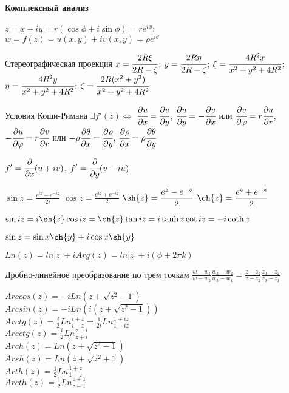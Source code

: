 \begin{center}
	\textbf{Комплексный анализ}
\end{center}
\vspace{1ex}

$\displaystyle z = x + iy = r(\cos{\phi} + i\sin{\phi}) = re^{i\phi}$;
$\displaystyle w = f(z) = u(x, y) + iv(x, y) = \rho e^{i\theta}$

\noindent
Стереографическая проекция
$\displaystyle x = \cfrac{2R\xi}{2R-\zeta}$;
$\displaystyle y = \cfrac{2R\eta}{2R-\zeta}$;
$\displaystyle \xi = \cfrac{4R^2x}{x^2+y^2+4R^2}$;
$\displaystyle \eta = \cfrac{4R^2y}{x^2+y^2+4R^2}$;
$\displaystyle \zeta = \cfrac{2R(x^2+y^2)}{x^2+y^2+4R^2}$

\noindent
Условия Коши-Римана $\displaystyle \exists f'(z) \Leftrightarrow$
$\displaystyle \cfrac{\partial u}{\partial x} = \cfrac{\partial v}{\partial y}$,
$\displaystyle \cfrac{\partial u}{\partial y} = -\cfrac{\partial v}{\partial x}$ или
$\displaystyle \cfrac{\partial v}{\partial \phi} = r\cfrac{\partial u}{\partial r}$,
$-\displaystyle \cfrac{\partial u}{\partial \phi} = r\cfrac{\partial v}{\partial r}$ или
$\displaystyle -\rho\cfrac{\partial \theta}{\partial x} = \cfrac{\partial \rho}{\partial y}$,
$\displaystyle \cfrac{\partial \rho}{\partial x} = \rho \cfrac{\partial \theta}{\partial y}$

$\displaystyle f'=\cfrac{\partial}{\partial x}(u + iv)$,
$\displaystyle f' = \cfrac{\partial}{\partial y}(v -iu)$

$\displaystyle \sin{z} = \frac{e^{iz} - e^{-iz}}{2i}$
$\displaystyle \cos{z} = \frac{e^{iz} + e^{-iz}}{2}$
$\displaystyle \sh{z} = \frac{e^{z} - e^{-z}}{2}$
$\displaystyle \ch{z} = \frac{e^{z} + e^{-z}}{2}$

$\displaystyle \sin{iz} = i\sh{z} \cos{iz} = \ch{z}
\tan{iz} = i\tanh{z} \cot{iz} = -i\coth{z}$

$\displaystyle \sin{z} = \sin{x}\ch{y} + i\cos{x}\sh{y}$

$\displaystyle Ln(z) = ln|z| + iArg(z) = ln|z| + i(\phi + 2\pi k)$

Дробно-линейное преобразование по трем точкам
$\displaystyle \frac{w-w_1}{w-w_2}\frac{w_3-w_2}{w_3-w_1} =
\frac{z-z_1}{z-z_2}\frac{z_3-z_2}{z_3-z_1}$

$\displaystyle Arccos(z) = -iLn(z + \sqrt{z^2-1})$ \\
$\displaystyle Arcsin(z) = -iLn(i(z + \sqrt{z^2 - 1}))$ \\
$\displaystyle Arctg(z) = \frac{i}{2}Ln\frac{i+z}{i-z} = \frac{1}{2i}Ln\frac{1+iz}{1-iz}$ \\
$\displaystyle Arcctg(z) = \frac{i}{2}Ln\frac{z-i}{z+i}$ \\
$\displaystyle Arch(z) = Ln(z+\sqrt{z^2 - 1})$ \\
$\displaystyle Arsh(z) = Ln(z+\sqrt{z^2 + 1})$ \\
$\displaystyle Arth(z) = \frac{1}{2}Ln\frac{1+z}{1-z}$ \\
$\displaystyle Arcth(z) = \frac{1}{2}Ln\frac{z+1}{z-1}$





